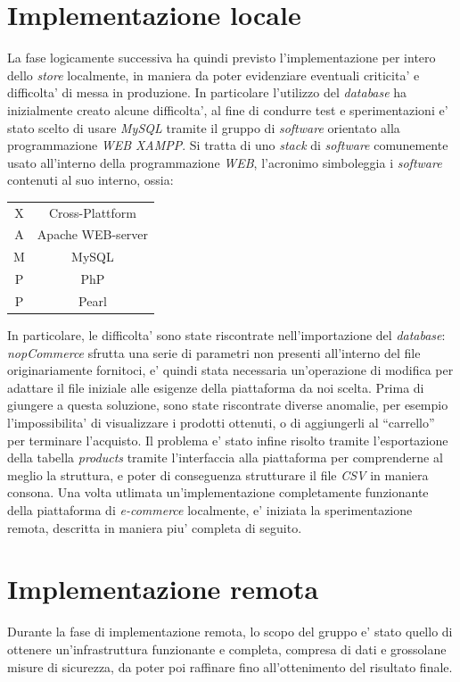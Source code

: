 \documentclass[a4paper]{report}
\newcommand{\quotes}[1]{``#1''}
\begin{document}
	\section{Implementazione locale}\label{implementazione_locale}
		La fase logicamente successiva ha quindi previsto l'implementazione per intero dello \emph{store} localmente,
		in maniera da poter evidenziare eventuali criticita' e difficolta' di messa in produzione. In particolare
		l'utilizzo del \emph{database} ha inizialmente creato alcune difficolta', al fine di condurre test e
		sperimentazioni e' stato scelto di usare \emph{MySQL} tramite il gruppo di \emph{software} orientato alla
		programmazione \emph{WEB} \emph{XAMPP}. Si tratta di uno \emph{stack} di \emph{software} comunemente usato
		all'interno della programmazione \emph{WEB}, l'acronimo simboleggia i \emph{software} contenuti al suo interno,
		ossia:
		\begin{center}
			\begin{tabular}{c c}
				X & Cross-Plattform \\
				A & Apache WEB-server \\
				M & MySQL \\
				P & PhP \\
				P & Pearl \\
			\end{tabular}
		\end{center}
		In particolare, le difficolta' sono state riscontrate nell'importazione del \emph{database}: \emph{nopCommerce}
		sfrutta una serie di parametri non presenti all'interno del file originariamente fornitoci, e' quindi stata
		necessaria un'operazione di modifica per adattare il file iniziale alle esigenze della piattaforma da noi
		scelta.
		Prima di giungere a questa soluzione, sono state riscontrate diverse anomalie, per esempio l'impossibilita' di
		visualizzare i prodotti ottenuti, o di aggiungerli al \quotes{carrello} per terminare l'acquisto.
		Il problema e' stato infine risolto tramite l'esportazione della tabella \emph{products} tramite
		l'interfaccia alla piattaforma per comprenderne al meglio la struttura, e poter di conseguenza strutturare il
		file \emph{CSV} in maniera consona.
		Una volta utlimata un'implementazione completamente funzionante della piattaforma di \emph{e-commerce}
		localmente, e' iniziata la sperimentazione remota, descritta in maniera piu' completa di seguito.
	 \section{Implementazione remota}\label{implementazione_remota}
		Durante la fase di implementazione remota, lo scopo del gruppo e' stato quello di ottenere un'infrastruttura
		funzionante e completa, compresa di dati e grossolane misure di sicurezza, da poter poi raffinare fino
		all'ottenimento del risultato finale.
\end{document}
